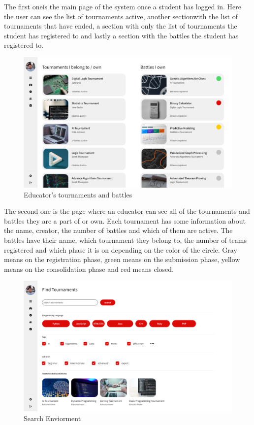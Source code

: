 \documentclass{article}
\begin{document}
The first oneis the main page of the system once a student has logged in. Here the user can see the 
list of tournaments active, another sectionwith the list of tournaments that have ended, a section 
with only the list of tournaments the student has registered to and lastly a section with the battles 
the student has registered to.

\newpage

\begin{figure}[!h]
    \centering
    \includegraphics[width=1\textwidth]{images/UI/Educator's tournaments-battles}
    \caption{Educator's tournaments and battles}
    \label{fig:Educatorstournamentsbattles}
\end{figure}

The second one is the page where an educator can see all of the tournaments and battles they are a part of or own. 
Each tournament has some information about the name, creator, the number of battles and which of them are active.
The battles have their name, which tournament they belong to, the number of teams registered and which phase it is on
depending on the color of the circle. Gray means on the registration phase, green means on the submission phase, yellow
means on the consolidation phase and red means closed.

\newpage

\begin{figure}[!h]
    \centering
    \includegraphics[width=1\textwidth]{images/UI/Search}
    \caption{Search Enviorment}
    \label{fig:Search}
\end{figure}
\end{document}
